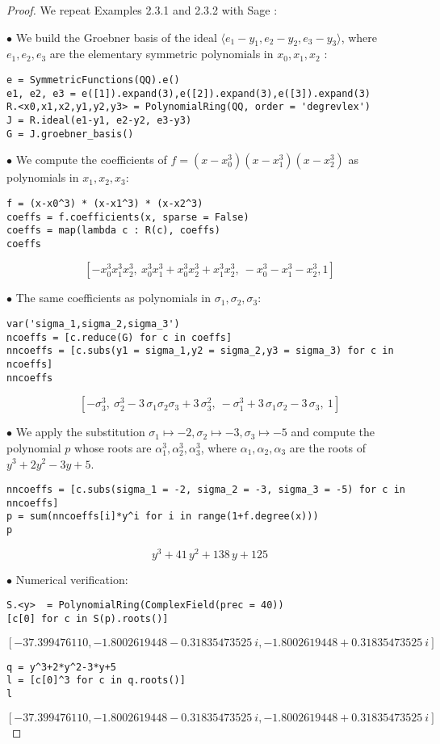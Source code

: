 \documentclass[11pt,a4paper]{article}
\begin{document}
\begin{proof}
We repeat Examples 2.3.1 and 2.3.2 with Sage :

$\bullet$ We build the Groebner basis of the ideal $\langle e_1 - y_1, e_2-y_2,e_3-y_3\rangle$, where $e_1,e_2,e_3$ are the elementary symmetric polynomials in $x_0,x_1,x_2$ :

\begin{verbatim}
e = SymmetricFunctions(QQ).e()
e1, e2, e3 = e([1]).expand(3),e([2]).expand(3),e([3]).expand(3)
R.<x0,x1,x2,y1,y2,y3> = PolynomialRing(QQ, order = 'degrevlex')
J = R.ideal(e1-y1, e2-y2, e3-y3)
G = J.groebner_basis()
\end{verbatim}

$\bullet$ We compute the coefficients of $f = (x-x_0^3) (x-x_1^3) (x-x_2^3)$ as  polynomials in $x_1,x_2,x_3$:
\begin{verbatim}
f = (x-x0^3) * (x-x1^3) * (x-x2^3)
coeffs = f.coefficients(x, sparse = False)
coeffs = map(lambda c : R(c), coeffs)
coeffs
\end{verbatim}
$$\left[- x_{0}^{3} x_{1}^{3} x_{2}^{3},\ x_{0}^{3} x_{1}^{3} + x_{0}^{3} x_{2}^{3} + x_{1}^{3} x_{2}^{3},\ - x_{0}^{3} -  x_{1}^{3} -  x_{2}^{3}, 1\right]$$

$\bullet$ The same coefficients as polynomials in $\sigma_1, \sigma_2, \sigma_3$:
\begin{verbatim}
var('sigma_1,sigma_2,sigma_3')
ncoeffs = [c.reduce(G) for c in coeffs]
nncoeffs = [c.subs(y1 = sigma_1,y2 = sigma_2,y3 = sigma_3) for c in ncoeffs]
nncoeffs
\end{verbatim}
$$\left[-\sigma_{3}^{3},\ \sigma_{2}^{3} - 3 \, \sigma_{1} \sigma_{2}
\sigma_{3} + 3 \, \sigma_{3}^{2},\  -\sigma_{1}^{3} + 3 \, \sigma_{1}
\sigma_{2} - 3 \, \sigma_{3},\ 1\right]$$

$\bullet$ We apply the substitution $\sigma_1 \mapsto -2, \sigma_2 \mapsto -3, \sigma_3 \mapsto -5$ and compute the polynomial $p$ whose roots are $\alpha_1^3,\alpha_2^3,\alpha_3^3$, where $\alpha_1, \alpha_2,\alpha_3$ are the roots of $y^3+2y^2-3y+5$.

\begin{verbatim}
nncoeffs = [c.subs(sigma_1 = -2, sigma_2 = -3, sigma_3 = -5) for c in nncoeffs]
p = sum(nncoeffs[i]*y^i for i in range(1+f.degree(x)))
p
\end{verbatim}
$$	y^{3} + 41 \, y^{2} + 138 \, y + 125$$


$\bullet$ Numerical verification:
\begin{verbatim}
S.<y>  = PolynomialRing(ComplexField(prec = 40))
[c[0] for c in S(p).roots()]
\end{verbatim}
$$\left[-37.399476110, -1.8002619448 - 0.31835473525\ i, -1.8002619448 + 0.31835473525\ i\right]$$
\begin{verbatim}
q = y^3+2*y^2-3*y+5
l = [c[0]^3 for c in q.roots()]
l
\end{verbatim}
$$\left[-37.399476110, -1.8002619448 - 0.31835473525\ i, -1.8002619448 + 0.31835473525\ i\right]$$
\end{proof}
\end{document}
